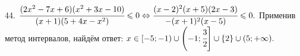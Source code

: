 44. $\cfrac{(2x^2-7x+6)(x^2+3x-10)}{(x+1)(5+4x-x^2)}\leqslant0\Leftrightarrow\cfrac{(x-2)^2(x+5)(2x-3)}{-(x+1)^2(x-5)}\leqslant0.$ Применив метод интервалов, найдём ответ: $x\in[-5;-1)\cup\left(-1;\cfrac{3}{2}\right]\cup\{2\}\cup(5;+\infty).$
\begin{figure}[ht!]
\end{figure}\newpage\noindent
